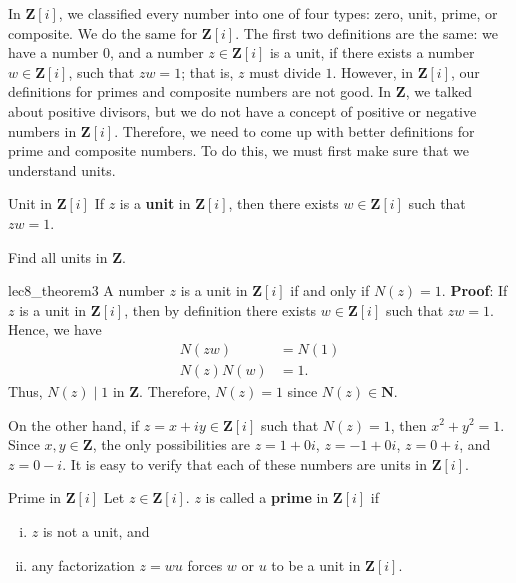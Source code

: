 In $ \mathbf{Z}[i] $, we classified every number into one of four types: zero, unit,
prime, or composite. We do the same for $ \mathbf{Z}[i] $. The first two definitions
are the same: we have a number 0, and a number $ z\in\mathbf{Z}[i] $ is a unit,
if there exists a number $ w\in\mathbf{Z}[i] $, such that $ zw=1 $; that is, $ z $
must divide $ 1 $. However, in $ \mathbf{Z}[i] $, our definitions for primes and composite
numbers are not good. In $ \mathbf{Z} $, we talked about positive divisors, but we do not have a concept
of positive or negative numbers in $ \mathbf{Z}[i] $. Therefore, we need to
come up with better definitions for prime and composite numbers. To do this,
we must first make sure that we understand units.
\begin{Definition}{Unit in $ \mathbf{Z}[i] $}{}
    If $ z $ is a \textbf{unit} in $ \mathbf{Z}[i] $, then there exists $ w\in\mathbf{Z}[i] $
    such that $ zw=1 $.
\end{Definition}
\begin{Example}{}{}
    Find all units in $ \mathbf{Z} $.
\end{Example}
\begin{Theorem}{}{lec8_theorem3}
    A number $ z $ is a unit in $ \mathbf{Z}[i] $ if and only if $ N(z)=1 $.
    \tcblower{}
    \textbf{Proof}: If $ z $ is a unit in $ \mathbf{Z}[i] $, then by definition
    there exists $ w\in\mathbf{Z}[i] $ such that $ zw=1 $. Hence, we have
    \begin{align*}
        N(zw)    & =N(1) \\
        N(z)N(w) & =1.
    \end{align*}
    Thus, $ N(z)\mid 1 $ in $ \mathbf{Z} $. Therefore, $ N(z)=1 $ since $ N(z)\in\mathbf{N} $.

    On the other hand, if $ z=x+iy\in\mathbf{Z}[i] $ such that $ N(z)=1 $, then $ x^2+y^2=1 $.
    Since $ x,y\in\mathbf{Z} $, the only possibilities are $ z=1+0i $, $ z=-1+0i $, $ z=0+i $,
    and $ z=0-i $. It is easy to verify that each of these numbers are units in $ \mathbf{Z}[i] $.
\end{Theorem}
\begin{Definition}{Prime in $ \mathbf{Z}[i] $}{}
    Let $ z\in\mathbf{Z}[i] $. $ z $ is called a \textbf{prime} in $ \mathbf{Z}[i] $ if
    \begin{enumerate}[(i)]
        \item $ z $ is not a unit, and
        \item any factorization $ z=wu $ forces $ w $ or $ u $ to be a unit in $ \mathbf{Z}[i] $.
    \end{enumerate}
\end{Definition}
